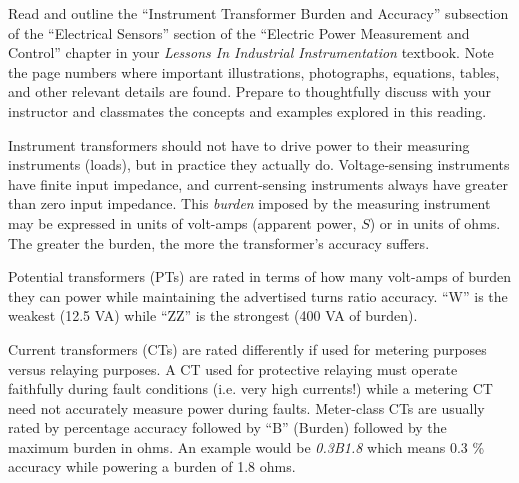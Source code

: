 

Read and outline the ``Instrument Transformer Burden and Accuracy'' subsection of the ``Electrical Sensors'' section of the ``Electric Power Measurement and Control'' chapter in your {\it Lessons In Industrial Instrumentation} textbook.  Note the page numbers where important illustrations, photographs, equations, tables, and other relevant details are found.  Prepare to thoughtfully discuss with your instructor and classmates the concepts and examples explored in this reading.













Instrument transformers should not have to drive power to their measuring instruments (loads), but in practice they actually do.  Voltage-sensing instruments have finite input impedance, and current-sensing instruments always have greater than zero input impedance.  This {\it burden} imposed by the measuring instrument may be expressed in units of volt-amps (apparent power, $S$) or in units of ohms.  The greater the burden, the more the transformer's accuracy suffers.

\vskip 10pt

Potential transformers (PTs) are rated in terms of how many volt-amps of burden they can power while maintaining the advertised turns ratio accuracy.  ``W'' is the weakest (12.5 VA) while ``ZZ'' is the strongest (400 VA of burden).

\vskip 10pt

Current transformers (CTs) are rated differently if used for metering purposes versus relaying purposes.  A CT used for protective relaying must operate faithfully during fault conditions (i.e. very high currents!) while a metering CT need not accurately measure power during faults.  Meter-class CTs are usually rated by percentage accuracy followed by ``B'' (Burden) followed by the maximum burden in ohms.  An example would be {\it 0.3B1.8} which means 0.3 \% accuracy while powering a burden of 1.8 ohms.

